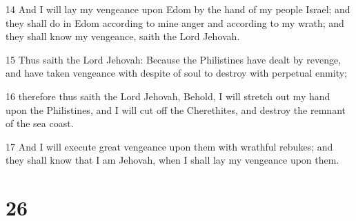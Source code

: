 \par 14 And I will lay my vengeance upon Edom by the hand of my people Israel; and they shall do in Edom according to mine anger and according to my wrath; and they shall know my vengeance, saith the Lord Jehovah.
\par 15 Thus saith the Lord Jehovah: Because the Philistines have dealt by revenge, and have taken vengeance with despite of soul to destroy with perpetual enmity;
\par 16 therefore thus saith the Lord Jehovah, Behold, I will stretch out my hand upon the Philistines, and I will cut off the Cherethites, and destroy the remnant of the sea coast.
\par 17 And I will execute great vengeance upon them with wrathful rebukes; and they shall know that I am Jehovah, when I shall lay my vengeance upon them.

\chapter{26}


